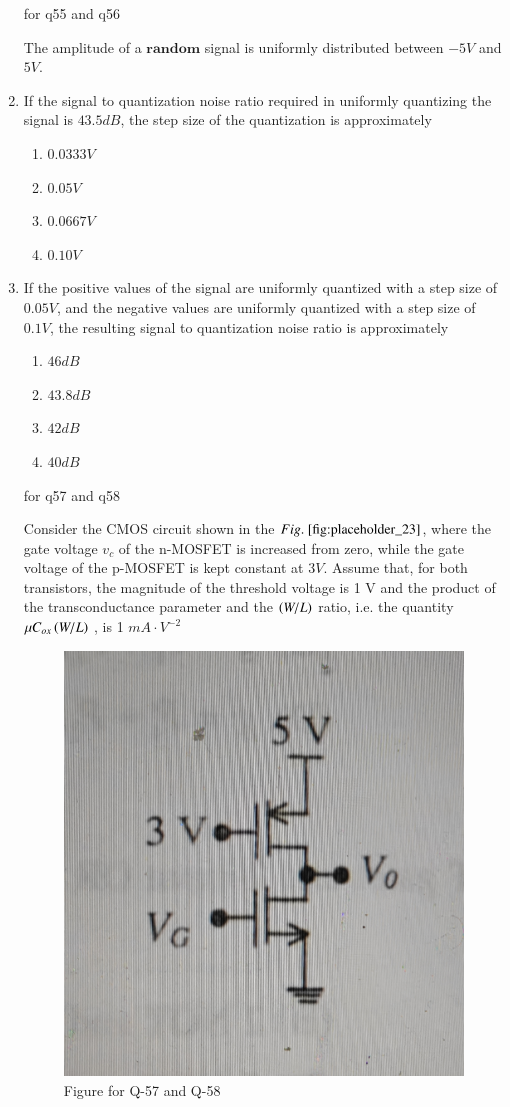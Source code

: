 \documentclass[journal,12pt,onecolumn]{IEEEtran}
\theoremstyle{remark}
\begin{document}
\begin{enumerate}[start=1, label={Q\arabic*.}]
for q55 and q56 

The amplitude of a $\textbf{random}$ signal is uniformly distributed between $-5V$ and $5V$.

\item If the signal to quantization noise ratio required in uniformly quantizing the signal is $43.5 dB$, the step size of the quantization is approximately 
\begin{enumerate}
    \item $0.0333 V$
    \item $0.05 V$
    \item $0.0667 V$
    \item $0.10 V$
\end{enumerate}

\item If the positive values of the signal are uniformly quantized with a step size of $0.05 V$, and the negative values are uniformly quantized with a step size of $0.1 V$, the resulting signal to quantization noise ratio is approximately 
\begin{enumerate}
    \item $46 dB$
    \item $43.8 dB$
    \item $42 dB$
    \item $40 dB$
\end{enumerate}

for q57 and q58

Consider the CMOS circuit shown in the $\figref{fig:placeholder_23}$, where the gate voltage $v_{c}$ of the n-MOSFET is increased from zero, while the gate voltage of the p-MOSFET is kept constant at $3 V$. Assume that, for both transistors, the magnitude of the threshold voltage is 1 V and the product of the transconductance parameter and the $\left(W/L\right)$ ratio, i.e. the quantity $\mu C_{ox} \left(W/L\right)$ , is 1 $mA \cdot V^{-2}$
\begin{figure}[H]
    \centering
    \includegraphics[width=0.5\columnwidth]{figs/fig_23.jpg}
    \caption{\centering Figure for Q-57 and Q-58}
    \label{fig:placeholder_22}
\end{figure}


\end{enumerate}
\end{document}
